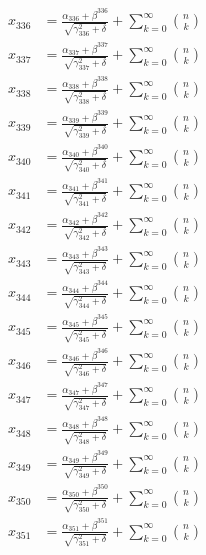 \documentclass{article}
\begin{document}
\begin{align}
  x_{336} &= \frac{\alpha_{336} + \beta^{336}}{\sqrt{\gamma_{336}^2 + \delta}} + \sum_{k=0}^{\infty} \binom{n}{k} \label{eq:336} \\
  x_{337} &= \frac{\alpha_{337} + \beta^{337}}{\sqrt{\gamma_{337}^2 + \delta}} + \sum_{k=0}^{\infty} \binom{n}{k} \label{eq:337} \\
  x_{338} &= \frac{\alpha_{338} + \beta^{338}}{\sqrt{\gamma_{338}^2 + \delta}} + \sum_{k=0}^{\infty} \binom{n}{k} \label{eq:338} \\
  x_{339} &= \frac{\alpha_{339} + \beta^{339}}{\sqrt{\gamma_{339}^2 + \delta}} + \sum_{k=0}^{\infty} \binom{n}{k} \label{eq:339} \\
  x_{340} &= \frac{\alpha_{340} + \beta^{340}}{\sqrt{\gamma_{340}^2 + \delta}} + \sum_{k=0}^{\infty} \binom{n}{k} \label{eq:340} \\
  x_{341} &= \frac{\alpha_{341} + \beta^{341}}{\sqrt{\gamma_{341}^2 + \delta}} + \sum_{k=0}^{\infty} \binom{n}{k} \label{eq:341} \\
  x_{342} &= \frac{\alpha_{342} + \beta^{342}}{\sqrt{\gamma_{342}^2 + \delta}} + \sum_{k=0}^{\infty} \binom{n}{k} \label{eq:342} \\
  x_{343} &= \frac{\alpha_{343} + \beta^{343}}{\sqrt{\gamma_{343}^2 + \delta}} + \sum_{k=0}^{\infty} \binom{n}{k} \label{eq:343} \\
  x_{344} &= \frac{\alpha_{344} + \beta^{344}}{\sqrt{\gamma_{344}^2 + \delta}} + \sum_{k=0}^{\infty} \binom{n}{k} \label{eq:344} \\
  x_{345} &= \frac{\alpha_{345} + \beta^{345}}{\sqrt{\gamma_{345}^2 + \delta}} + \sum_{k=0}^{\infty} \binom{n}{k} \label{eq:345} \\
  x_{346} &= \frac{\alpha_{346} + \beta^{346}}{\sqrt{\gamma_{346}^2 + \delta}} + \sum_{k=0}^{\infty} \binom{n}{k} \label{eq:346} \\
  x_{347} &= \frac{\alpha_{347} + \beta^{347}}{\sqrt{\gamma_{347}^2 + \delta}} + \sum_{k=0}^{\infty} \binom{n}{k} \label{eq:347} \\
  x_{348} &= \frac{\alpha_{348} + \beta^{348}}{\sqrt{\gamma_{348}^2 + \delta}} + \sum_{k=0}^{\infty} \binom{n}{k} \label{eq:348} \\
  x_{349} &= \frac{\alpha_{349} + \beta^{349}}{\sqrt{\gamma_{349}^2 + \delta}} + \sum_{k=0}^{\infty} \binom{n}{k} \label{eq:349} \\
  x_{350} &= \frac{\alpha_{350} + \beta^{350}}{\sqrt{\gamma_{350}^2 + \delta}} + \sum_{k=0}^{\infty} \binom{n}{k} \label{eq:350} \\
  x_{351} &= \frac{\alpha_{351} + \beta^{351}}{\sqrt{\gamma_{351}^2 + \delta}} + \sum_{k=0}^{\infty} \binom{n}{k} \label{eq:351} \\

\end{align}
\end{document}
